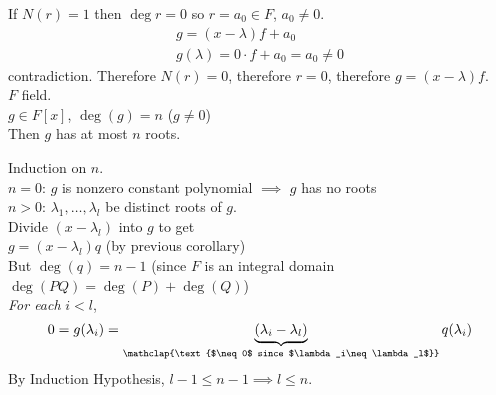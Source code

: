 If $N(r)=1$ then $\deg r=0$ so $r=a_0\in F$, $a_0\neq 0$.
\begin{gather*}
g = (x-\lambda) f + a_0 \\
g(\lambda) = 0\cdot f + a_0 = a_0 \neq 0
\end{gather*}
contradiction.  Therefore $N(r)=0$, therefore $r=0$, therefore $g=(x-\lambda)f$. \\
\cor $F$ field. \\
$g\in F[x]$, $\deg(g)=n$ ($g\neq0$) \\
Then $g$ has at most $n$ roots.

\pf Induction on $n$. \\
$n=0$: $g$ is nonzero constant polynomial $\implies$ $g$ has no roots \\
$n>0$: $\lambda_1,\dotsc,\lambda_l$ be distinct roots of $g$. \\
Divide $(x-\lambda_l)$ into $g$ to get \\
$g=(x-\lambda_l)q$ (by previous corollary) \\
But $\deg(q)=n-1$ (since $F$ is an integral domain $\deg(PQ)=\deg(P)+\deg(Q)$) \\
\emph{For each} $i<l$,
\[ 0 = g(\lambda_i) = \underbrace{(\lambda_i-\lambda_l)}_{\mathclap{\text{$\neq0$ since $\lambda_i\neq\lambda_l$}}}q(\lambda_i) \]
By Induction Hypothesis, $l-1\leq n-1\implies l\leq n$.
